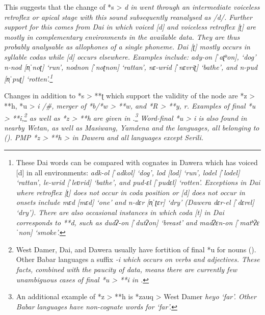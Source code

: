 This suggests that the change of *s > \it{d} in  went through an intermediate voiceless retroflex or apical
stage with this sound subsequently reanalysed as /d/.
Further support for this comes from Dai in which voiced [d]
and voiceless retroflex [ʈ] are mostly in complementary environments
in the available data.
They are thus probably analysable as allophones of a single phoneme.
Dai [ʈ] mostly occurs in syllable codas while [d] occurs elsewhere.
Examples include: \it{ady-on} [ˈaʈʰon], ‘dog’ \it{n-nod} [n̩ˈnoʈ]
‘run’, \it{nodnon} [ˈnoʈnon] ‘rattan’, \it{nɛ-wrid} [ˈnɛvriʈ] ‘bathe’,
and \it{n-pud} [n̩ˈpuʈ] ‘rotten’.\footnote{
		These Dai words can
		be compared with cognates in Dawera which has voiced [d] in all
		environments: \it{adk-ol} [ˈadkol] ‘dog’,
		\it{lod} [lod] ‘run’, \it{lodel} [ˈlodel] ‘rattan’,
		\it{le-wrid} [ˈleʋrid] ‘bathe’, and \it{pud-ɛl} [ˈpudɛl] ‘rotten’.
		Exceptions in Dai where retroflex [ʈ] does not occur in coda
		position or [d] does not occur in onsets include \it{mɛd} [mɛd]
		‘one’ and \it{n-dɛr} [n̩ˈʈɛr] ‘dry’ (Dawera \it{dɛr-el} [ˈdɛrel] ‘dry’).
		There are also occasional instances in which coda [t] in Dai
		corresponds to **d, such as \it{dudʔ-on} [ˈdutʔon] ‘breast’
		and \it{madʔɛn-on} [ˈmatʰʔɛˈnon] ‘smoke’.}

Changes in addition to *s > **ʈ which support the validity of
the  node are *z > **h,
*u > \it{i} /{\gap\#},
merger of *b/*w > **w,
and *R > **y, \it{r}.
Examples of final *u > **i,\footnote{
		West Damer, Dai, and Dawera usually have fortition
		of final *u for nouns ().
		Other Babar languages a suffix \it{-i} which occurs on verbs and adjectives.
		These facts, combined with the paucity of data,
		means there are currently few unambiguous cases of final *u >
				**i in .}
as well as *z > **h are given in .\footnote{
		An additional example of *z > **h is *zauq > West Damer \it{heyo} ‘far’.
		Other Babar languages have non-cognate words for ‘far’.}
Word-final *u > \it{i} is also found in nearby Wetan,
as well as Masiwang,
Yamdena and the  languages,
all belonging to 
().
PMP *z > **h > {\0} in Dawera
and all  languages except Serili.

